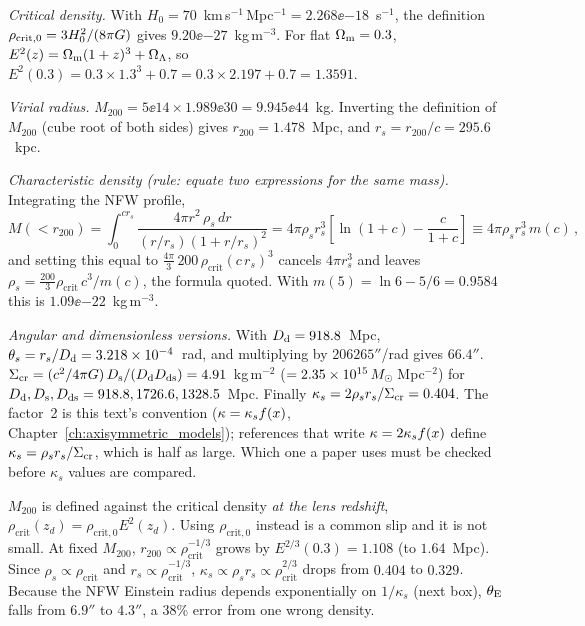 \begin{derivation}
\textit{Critical density.} With $H_0 = 70$~km\,s$^{-1}$\,Mpc$^{-1}
= 2.268\ee{-18}$~s$^{-1}$, the definition
$\rho_{\mathrm{crit},0} = 3H_0^2/(8\pi G)$ gives
$9.20\ee{-27}$~kg\,m$^{-3}$.  For flat $\Omega_{\mathrm{m}} = 0.3$,
$E^2(z) = \Omega_{\mathrm{m}}(1+z)^3 + \Omega_{\Lambda}$, so
$E^2(0.3) = 0.3 \times 1.3^3 + 0.7 = 0.3\times2.197 + 0.7 = 1.3591$.

\textit{Virial radius.} $M_{200} = 5\ee{14} \times 1.989\ee{30}
= 9.945\ee{44}$~kg.  Inverting the definition of $M_{200}$ (cube root of
both sides) gives $r_{200} = 1.478$~Mpc, and $r_s = r_{200}/c = 295.6$~kpc.

\textit{Characteristic density (rule: equate two expressions for the same
mass).}  Integrating the NFW profile,
\begin{equation*}
    M(<r_{200}) = \int_0^{c r_s} \frac{4\pi r^2\,\rho_s\,dr}
    {(r/r_s)(1+r/r_s)^2}
    = 4\pi\rho_s r_s^3\left[\ln(1+c) - \frac{c}{1+c}\right]
    \equiv 4\pi\rho_s r_s^3\, m(c)\,,
\end{equation*}
and setting this equal to $\tfrac{4\pi}{3}\,200\,\rho_{\mathrm{crit}}
(c\,r_s)^3$ cancels $4\pi r_s^3$ and leaves
$\rho_s = \tfrac{200}{3}\rho_{\mathrm{crit}}\,c^3/m(c)$, the formula quoted.
With $m(5) = \ln 6 - 5/6 = 0.9584$ this is $1.09\ee{-22}$~kg\,m$^{-3}$.

\textit{Angular and dimensionless versions.}  With $D_{\mathrm{d}} = 918.8$~Mpc,
$\theta_s = r_s/D_{\mathrm{d}} = 3.218\times 10^{-4}$~rad, and multiplying by
$206265''$/rad gives $66.4''$.  $\Sigma_{\mathrm{cr}} = (c^2/4\pi G)\,
D_{\mathrm{s}}/(D_{\mathrm{d}}D_{\mathrm{ds}}) = 4.91$~kg\,m$^{-2}$ ($= 2.35\times 10^{15}\,M_{\odot}$\,Mpc$^{-2}$) for
$D_{\mathrm{d}}, D_{\mathrm{s}}, D_{\mathrm{ds}} = 918.8, 1726.6, 1328.5$~Mpc.  Finally
$\kappa_s = 2\rho_s r_s/\Sigma_{\mathrm{cr}} = 0.404$.  The factor~2 is this text's
convention ($\kappa = \kappa_s f(x)$, Chapter~\ref{ch:axisymmetric_models});
references that write $\kappa = 2\kappa_s f(x)$ define
$\kappa_s = \rho_s r_s/\Sigma_{\mathrm{cr}}$, which is half as large.  Which one a
paper uses must be checked before $\kappa_s$ values are compared.
\end{derivation}

\begin{annotation}
$M_{200}$ is defined against the critical density \emph{at the lens
redshift}, $\rho_{\mathrm{crit}}(z_d) = \rho_{\mathrm{crit},0}E^2(z_d)$.
Using $\rho_{\mathrm{crit},0}$ instead is a common slip and it is not
small.  At fixed $M_{200}$, $r_{200} \propto \rho_{\mathrm{crit}}^{-1/3}$
grows by $E^{2/3}(0.3) = 1.108$ (to $1.64$~Mpc).  Since
$\rho_s \propto \rho_{\mathrm{crit}}$ and $r_s \propto
\rho_{\mathrm{crit}}^{-1/3}$, $\kappa_s \propto \rho_s r_s \propto
\rho_{\mathrm{crit}}^{2/3}$ drops from $0.404$ to $0.329$.  Because the NFW
Einstein radius depends exponentially on $1/\kappa_s$ (next box),
$\theta_{\mathrm{E}}$ falls from $6.9''$ to $4.3''$, a 38\% error from one wrong
density.
\end{annotation}

